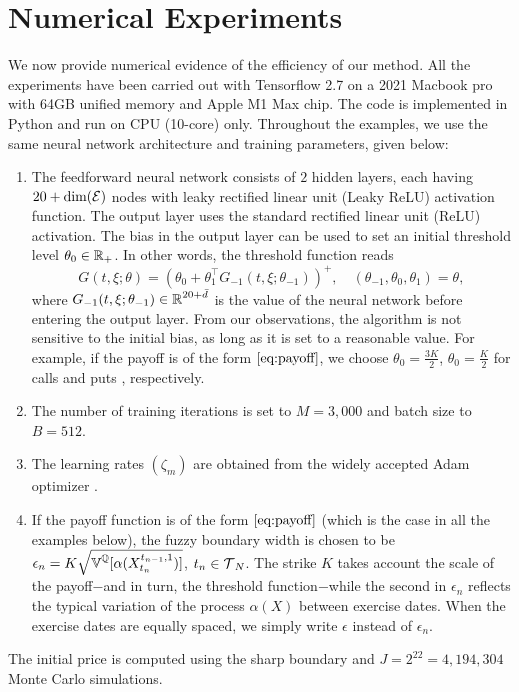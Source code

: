 \section{Numerical Experiments}

We now provide numerical evidence of the efficiency of our method. All the  experiments have been carried out  with Tensorflow 2.7  on a 2021 Macbook pro with 64GB unified memory and Apple M1 Max chip. The code is implemented in Python and run on CPU (10-core) only.  
Throughout the examples, we use the same neural network architecture and training parameters,  given  below:
\begin{enumerate}
\item The feedforward neural network consists of $2$ hidden layers, each having $20 + \text{dim}(\operatorname{\mathcal{E}})$  nodes  with leaky rectified linear unit (Leaky ReLU) activation function. The output layer uses the standard rectified linear unit (ReLU)  activation. The  bias in the output layer can be used to set  an initial threshold level $\theta_0 \in \operatorname{\mathbb{R}}_+$.     In other words, the  threshold function reads
$$G(t,\xi; \theta) = \left(\theta_0 + \theta_1^{\top} G_{-1}(t,\xi; \theta_{-1})\right)^+, \quad (\theta_{-1}, \theta_{0}, \theta_1) = \theta, $$ %
where  $G_{-1}(t,\xi; \theta_{-1}) \in \operatorname{\mathbb{R}}^{20+\bar{d}}$ is the value of the neural network before entering the output layer. From our observations, the algorithm is not sensitive to the initial bias, as long as it is set to a reasonable value.  For example, if the payoff is of the form   $\eqref{eq:payoff}$, we  choose $\theta_0=\frac{3K}{2}$,  $\theta_0=\frac{K}{2}$ for  calls 
and puts
,  respectively. 

\item The number of training iterations is set to $M=3,000$ and batch size to $B = 512$. 
    \item The learning rates $(\zeta_m)$ are obtained from the widely accepted Adam optimizer \cite{Kingma}.
    
    \item  
    If the payoff function is of the form
    $\eqref{eq:payoff}$ (which is the case in all the examples below), the fuzzy boundary width is chosen to be    
    $\epsilon_n = K \sqrt{\operatorname{\mathbb{V}}^{\operatorname{\mathbb{Q}}}[ \alpha(X^{t_{n-1},1}_{t_n})]}$, $t_n \in \operatorname{\mathcal{T}}_N$. 
     The strike $K$ takes account the scale of the payoff$-$and in turn, the threshold function$-$while  the second in $\epsilon_n$ reflects the typical variation 
     of the  process $\alpha(X)$ between exercise dates. When the exercise dates are equally spaced, we simply write $\epsilon$ instead of $\epsilon_n$. 
\end{enumerate}
The initial price is computed using the sharp boundary and $J= 2^{22} = 4,194,304$ Monte Carlo simulations. 

